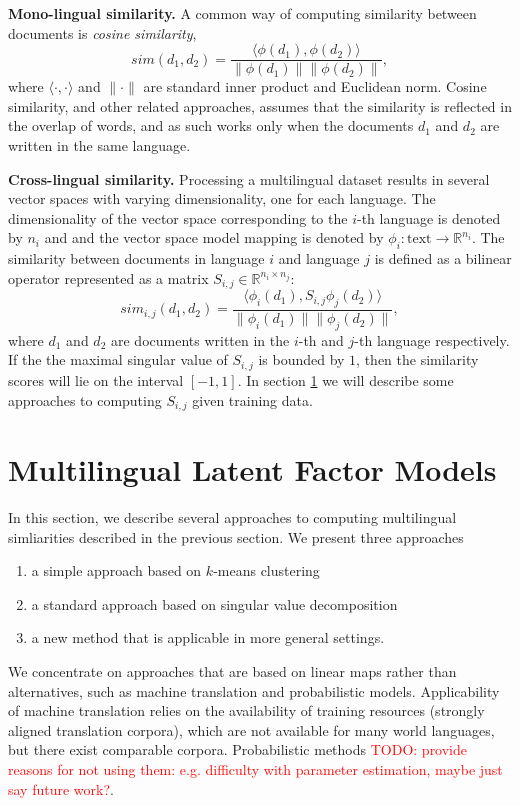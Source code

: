 \documentclass[twoside,11pt]{article}
\newcommand{\todo}[1]{\textcolor{red}{TODO: #1}}
\newcommand{\RR}{\mathbb{R}}
\begin{document}
\textbf {Mono-lingual similarity.}
A common way of computing similarity between documents is \emph{cosine similarity},
$$sim(d_1, d_2) = \frac{\langle \phi(d_1), \phi(d_2)\rangle}{\|\phi(d_1)\| \|\phi(d_2)\|},$$
where $\langle \cdot,\cdot \rangle$ and $\|\cdot\|$ are standard inner product and Euclidean norm. Cosine similarity, and other related approaches, assumes that the similarity is reflected in the overlap of words, and as such works only when the documents $d_1$ and $d_2$ are written in the same language.

\textbf {Cross-lingual similarity.}
Processing a multilingual dataset results in several vector spaces with varying dimensionality, one for each language. The dimensionality of the vector space corresponding to the $i$-th language is denoted by $n_i$ and and the vector space model mapping is denoted by $\phi_i : \text{text} \rightarrow \RR^{n_i}$.
The similarity between documents in language $i$ and language $j$ is defined as a bilinear operator represented as a matrix $S_{i,j} \in \RR^{n_i \times n_j}$:
$$sim_{i,j}(d_1, d_2) = \frac{ \langle \phi_i (d_1), S_{i,j} \phi_j (d_2) \rangle }{\|\phi_i(d_1)\| \|\phi_j(d_2)\|},$$
where $d_1$ and $d_2$ are documents written in the $i$-th and $j$-th language respectively. If the the maximal singular value of $S_{i,j}$ is bounded by $1$, then the similarity scores will lie on the interval $[-1, 1]$. In section \ref{sec:models} we will describe some approaches to computing $S_{i,j}$ given training data.

\section{Multilingual Latent Factor Models}\label{sec:models}
In this section, we describe several approaches to computing multilingual simliarities described in the previous section. We present three approaches
\begin{enumerate}
\item  a simple approach based on $k$-means clustering
\item  a standard approach based on singular value decomposition 
\item a new method that is applicable in more general settings.
\end{enumerate}
 We concentrate on approaches that are based on linear maps rather than alternatives, such as machine translation and probabilistic models. Applicability of machine translation relies
on the availability of training resources (strongly aligned translation corpora), which are not available for many world languages, but there exist comparable corpora. Probabilistic
methods \todo{provide reasons for not using them: e.g. difficulty with parameter estimation, maybe just say future work?}.
\end{document}
